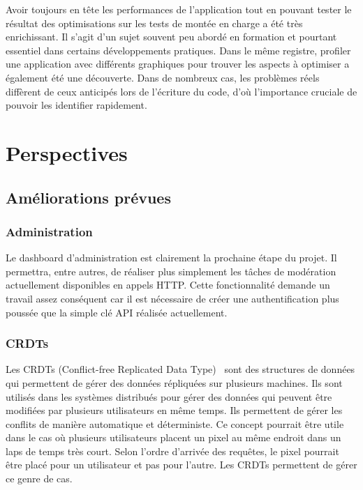 Avoir toujours en tête les performances de l'application tout en pouvant tester le résultat des optimisations sur les tests de montée en charge a été très enrichissant. Il s'agit d'un sujet souvent peu abordé en formation et pourtant essentiel dans certains développements pratiques. Dans le même registre, profiler une application avec différents graphiques pour trouver les aspects à optimiser a également été une découverte. Dans de nombreux cas, les problèmes réels diffèrent de ceux anticipés lors de l'écriture du code, d'où l'importance cruciale de pouvoir les identifier rapidement.

\section{Perspectives}
\label{perspectives}


\subsection{Améliorations prévues}

\subsubsection{Administration}

Le dashboard d'administration est clairement la prochaine étape du projet. Il permettra, entre autres, de réaliser plus simplement les tâches de modération actuellement disponibles en appels HTTP. Cette fonctionnalité demande un travail assez conséquent car il est nécessaire de créer une authentification plus poussée que la simple clé API réalisée actuellement.

\subsubsection{CRDTs}

Les CRDTs (Conflict-free Replicated Data Type)~\cite{crdt} sont des structures de données qui permettent de gérer des données répliquées sur plusieurs machines. Ils sont utilisés dans les systèmes distribués pour gérer des données qui peuvent être modifiées par plusieurs utilisateurs en même temps. Ils permettent de gérer les conflits de manière automatique et déterministe. Ce concept pourrait être utile dans le cas où plusieurs utilisateurs placent un pixel au même endroit dans un laps de temps très court. Selon l'ordre d'arrivée des requêtes, le pixel pourrait être placé pour un utilisateur et pas pour l'autre. Les CRDTs permettent de gérer ce genre de cas.

